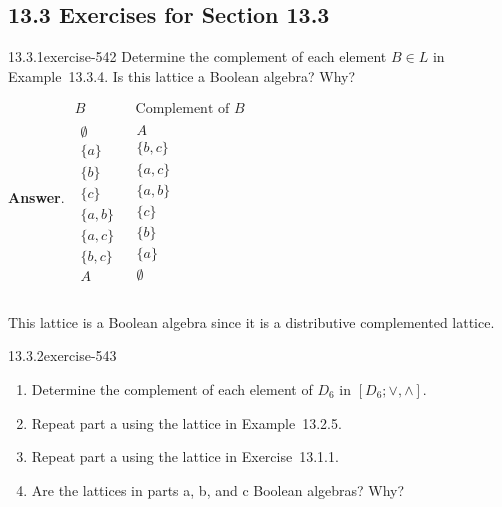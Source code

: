 \documentclass[twoside,10pt,]{book}
\numberwithin{equation}{section}
\begin{document}
\subsection*{13.3 Exercises for Section 13.3}
\begin{divisionsolution}{13.3.1}{}{exercise-542}%
\hypertarget{p-4872}{}%
Determine the complement of each element \(B \in  L\) in Example~13.3.4. Is this lattice a Boolean algebra? Why?%
\par\smallskip%
\noindent\textbf{Answer}.\quad%
\hypertarget{p-4873}{}%
\(\begin{array}{cc}
B & \textrm{ Complement of } B \\
\hline 
\begin{array}{c}
\emptyset  \\
\{a\} \\
\{b\} \\
\{c\} \\
\{a,b\} \\
\{a,c\} \\
\{b,c\} \\
A \\
\end{array}
& 
\begin{array}{c}
A \\
\{b,c\} \\
\{a,c\} \\
\{a,b\} \\
\{c\} \\
\{b\} \\
\{a\} \\
\emptyset  \\
\end{array}
\\
\end{array}\)%
\par
\hypertarget{p-4874}{}%
This lattice is a Boolean algebra since it is a distributive complemented lattice.%
\end{divisionsolution}%
\begin{divisionsolution}{13.3.2}{}{exercise-543}%
\hypertarget{p-4875}{}%
\leavevmode%
\begin{enumerate}[label=(\alph*)]
\item\hypertarget{li-2214}{}\hypertarget{p-4876}{}%
Determine the complement of each element of \(D_6\) in \(\left[D_6; \lor , \land \right]\).%
\item\hypertarget{li-2215}{}\hypertarget{p-4877}{}%
Repeat part a using the lattice in Example~13.2.5.%
\item\hypertarget{li-2216}{}\hypertarget{p-4878}{}%
Repeat part a using the lattice in Exercise~13.1.1.%
\item\hypertarget{li-2217}{}\hypertarget{p-4879}{}%
Are the lattices in parts a, b, and c Boolean algebras? Why?%
\end{enumerate}
%
\end{divisionsolution}%
\end{document}
